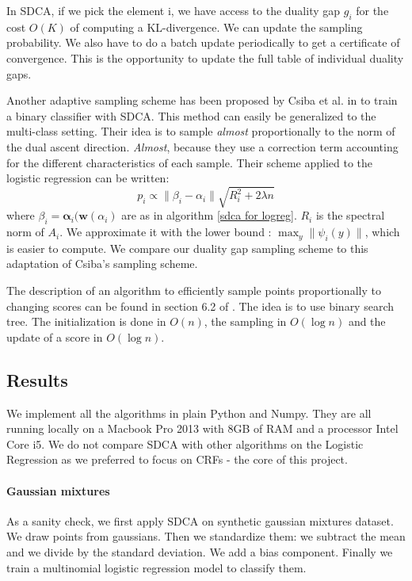 \documentclass{article}
\DeclareMathOperator{\1}{\mathbb{1}}
\begin{document}
In SDCA, if we pick the element i, we have access to the duality gap $g_i$ for the cost $O(K)$ of computing a KL-divergence.
We can update the sampling probability.
We also have to do a batch update periodically to get a certificate of convergence.
This is the opportunity to update the full table of individual duality gaps.

Another adaptive sampling scheme has been proposed by Csiba et al.  in \cite{csiba_stochastic_2015} to train a binary classifier with SDCA.
This method can easily be generalized to the multi-class setting.
Their idea is to sample \textit{almost} proportionally to the norm of the dual ascent direction.
\textit{Almost}, because they use a correction term accounting for the different characteristics of each sample.
Their scheme applied to the logistic regression can be written:
\begin{equation}
	\label{csiba}
	p_i \propto \| \beta_i - \alpha_i \| \sqrt{R_i^2 + 2 \lambda n} 
\end{equation}
where $\beta_i = \bm \alpha_i(\bm w(\alpha_i)$ are as in algorithm \ref{sdca for logreg}. 
$R_i$ is the spectral norm of $A_i$.
We approximate it with the lower bound : $\max_y \| \psi_i(y)\|$, which is easier to compute.
We compare our duality gap sampling scheme to this adaptation of Csiba's sampling scheme.

The description of an algorithm to efficiently sample points proportionally to changing scores can be found in section 6.2 of \cite{nesterov_efficiency_2012}.
The idea is to use binary search tree.
The initialization is done in $O(n)$, the sampling in $O(\log n)$ and the update of a score in $O(\log n)$.

\subsection{Results}

We implement all the algorithms in plain Python and Numpy.
They are all running locally on a Macbook Pro 2013 with 8GB of RAM and a processor Intel Core i5.
We do not compare SDCA with other algorithms on the Logistic Regression as we preferred to focus on CRFs - the core of this project.

\paragraph{Gaussian mixtures}
As a sanity check, we first apply SDCA on synthetic gaussian mixtures dataset.
We draw points from gaussians.
Then we standardize them: we subtract the mean and we divide by the standard deviation.
We add a bias component.
Finally we train a multinomial logistic regression model to classify them.
\end{document}
